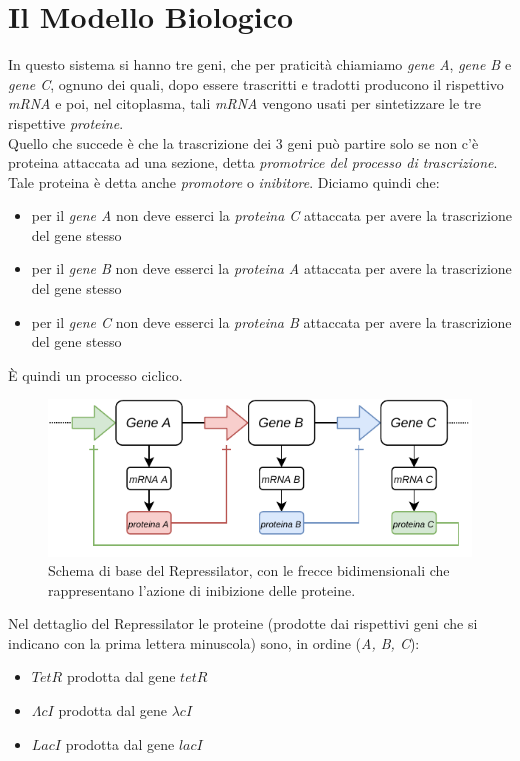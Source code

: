 \documentclass[a4paper,12pt, oneside]{book}
\begin{document}
\section{Il Modello Biologico}
In questo sistema si hanno tre geni, che per praticità chiamiamo \textit{gene
  A}, \textit{gene B} e \textit{gene C}, ognuno dei quali, dopo essere
trascritti e tradotti producono il rispettivo \textit{mRNA} e poi, nel
citoplasma, tali \textit{mRNA} vengono usati per sintetizzare le tre rispettive
\textit{proteine}. \\
Quello che succede è che la trascrizione dei 3 geni può partire solo se non c'è
proteina attaccata ad una sezione, detta \textit{promotrice del processo di
  trascrizione}. Tale proteina è detta anche \textit{promotore} o
\textit{inibitore}. Diciamo quindi che: 
\begin{itemize}
  \item per il \textit{gene A} non deve esserci la \textit{proteina C} attaccata
  per avere la trascrizione del gene stesso
  \item per il \textit{gene B} non deve esserci la \textit{proteina A} attaccata
  per avere la trascrizione del gene stesso
  \item per il \textit{gene C} non deve esserci la \textit{proteina B} attaccata
  per avere la trascrizione del gene stesso
\end{itemize}
È quindi un processo ciclico.
\begin{figure}
  \centering
  \includegraphics[scale = 1]{img/repr.pdf}
  \caption{Schema di base del Repressilator, con le frecce bidimensionali che
    rappresentano l'azione di inibizione delle proteine.}
  \label{fig:repr}
\end{figure}
Nel dettaglio del Repressilator le proteine (prodotte dai rispettivi geni che si
indicano con la prima lettera minuscola) sono, in ordine (\textit{A, B, C}):
\begin{itemize}
  \item $TetR$ prodotta dal gene $tetR$
  \item $\Lambda cI$ prodotta dal gene $\lambda cI$
  \item $LacI$ prodotta dal gene $lacI$
\end{itemize}
\end{document}
